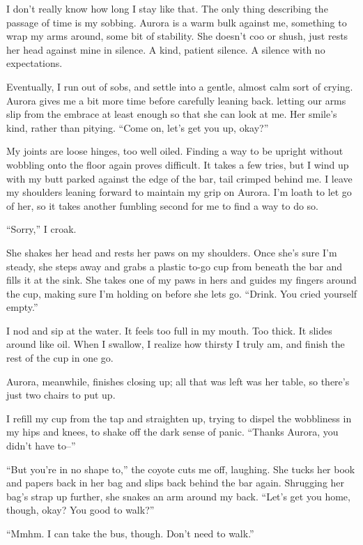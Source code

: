 I don't really know how long I stay like that. The only thing describing the passage of time is my sobbing. Aurora is a warm bulk against me, something to wrap my arms around, some bit of stability. She doesn't coo or shush, just rests her head against mine in silence. A kind, patient silence. A silence with no expectations.

Eventually, I run out of sobs, and settle into a gentle, almost calm sort of crying. Aurora gives me a bit more time before carefully leaning back. letting our arms slip from the embrace at least enough so that she can look at me. Her smile's kind, rather than pitying. ``Come on, let's get you up, okay?''

My joints are loose hinges, too well oiled. Finding a way to be upright without wobbling onto the floor again proves difficult. It takes a few tries, but I wind up with my butt parked against the edge of the bar, tail crimped behind me. I leave my shoulders leaning forward to maintain my grip on Aurora. I'm loath to let go of her, so it takes another fumbling second for me to find a way to do so.

``Sorry,'' I croak.

She shakes her head and rests her paws on my shoulders. Once she's sure I'm steady, she steps away and grabs a plastic to-go cup from beneath the bar and fills it at the sink. She takes one of my paws in hers and guides my fingers around the cup, making sure I'm holding on before she lets go. ``Drink. You cried yourself empty.''

I nod and sip at the water. It feels too full in my mouth. Too thick. It slides around like oil. When I swallow, I realize how thirsty I truly am, and finish the rest of the cup in one go.

Aurora, meanwhile, finishes closing up; all that was left was her table, so there's just two chairs to put up.

I refill my cup from the tap and straighten up, trying to dispel the wobbliness in my hips and knees, to shake off the dark sense of panic. ``Thanks Aurora, you didn't have to--''

``But you're in no shape to,'' the coyote cuts me off, laughing. She tucks her book and papers back in her bag and slips back behind the bar again. Shrugging her bag's strap up further, she snakes an arm around my back. ``Let's get you home, though, okay? You good to walk?''

``Mmhm. I can take the bus, though. Don't need to walk.''

